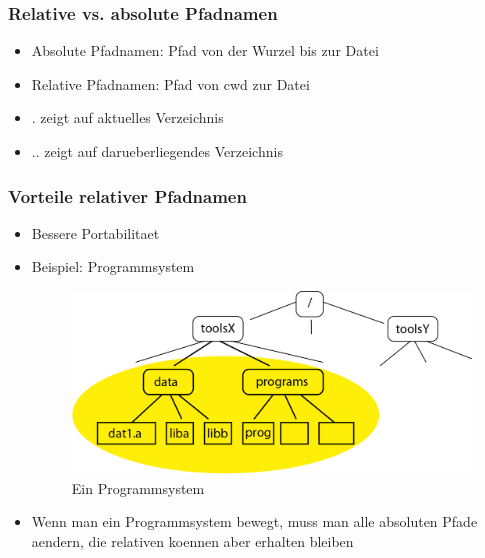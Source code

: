 \documentclass[a4paper]{scrreprt}
\begin{document}
\subsubsection{Relative vs. absolute Pfadnamen}
\begin{itemize}
	\item Absolute Pfadnamen: Pfad von der Wurzel bis zur Datei
	\item Relative Pfadnamen: Pfad von cwd zur Datei
	\item . zeigt auf aktuelles Verzeichnis
	\item .. zeigt auf darueberliegendes Verzeichnis
\end{itemize}

\subsubsection{Vorteile relativer Pfadnamen}
\begin{itemize}
	\item Bessere Portabilitaet
	\item Beispiel: Programmsystem
\begin{figure}[ht]
\centering
\includegraphics[scale=0.2]{graphics/program_system.png}
\caption{Ein Programmsystem}
\end{figure}
	\item Wenn man ein Programmsystem bewegt, muss man alle absoluten Pfade aendern, die relativen koennen aber erhalten bleiben
\end{itemize}
\end{document}
